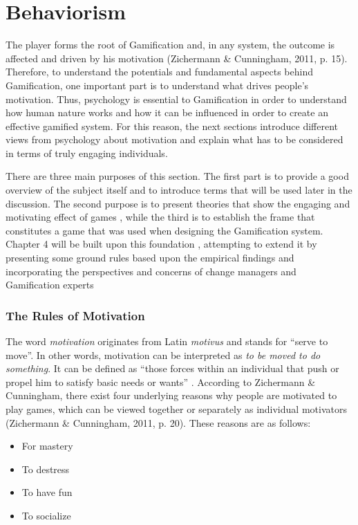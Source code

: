 \chapter{Behaviorism}\label{chapter:behaviorism}

The player forms the root of Gamification and, in any system, the outcome is affected and driven by his motivation (Zichermann \& Cunningham, 2011, p. 15). Therefore, to understand the potentials and fundamental aspects behind Gamification, one important part is to understand what drives people's motivation. Thus, psychology is  essential  to  Gamification  in order to understand  how  human  nature  works  and  how  it can  be  influenced  in  order  to  create  an  effective  gamified  system. For this reason, the next sections introduce different views from psychology about motivation and explain what has to be considered in terms of truly engaging individuals.  

There are three main purposes of this section. The first 
part is to provide a good overview of the subject itself and to introduce terms that will be used later in the discussion. The  second  purpose  is  to  present  theories  that  show  the engaging  and  motivating  effect of games
,  while the  third  is  to  establish  the  frame  that  constitutes  a  game  that  was  used  when 
designing the 
Gamification system.
Chapter 4 will be built upon this foundation
, attempting  to 
extend it by
presenting some ground rules based 
upon the 
empirical findings
and incorporating 
the perspectives and concerns of change managers and 
Gamification experts
\subsection{The Rules of Motivation}

The word \textit{motivation} originates from Latin \textit{motivus} and stands for ``serve to move''. In other words, motivation can be interpreted as \textit{to be moved to do something}. It can be defined as ``those forces within an individual that push or propel him to satisfy basic needs or wants'' \cite{pardee1990motivation}.  %
According to Zichermann \& Cunningham, there exist four underlying reasons why people are motivated to play games, which can be viewed together or separately as individual motivators (Zichermann \& Cunningham, 2011, p. 20). These reasons are as follows:
\begin{itemize}
\item For mastery
\item To destress
\item To have fun
\item To socialize
\end{itemize} 

